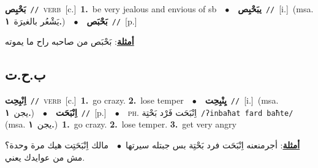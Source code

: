 \documentclass[10pt,a4paper,twoside]{article} %
\begin{document}
\begin{multicols}{2}
{{{{{\setlength\topsep{0pt}\textbf{\foreignlanguage{arabic}{بَحْبِص}}\ {\color{gray}\texttt{//}\color{black}}\ \textsc{verb}\ [c.]\ \textbf{1.}~be very jealous and envious of sb\ \ $\bullet$\ \ \setlength\topsep{0pt}\textbf{\foreignlanguage{arabic}{يبَحْبِص}}\ {\color{gray}\texttt{//}\color{black}}\ [i.]\ \color{gray}(msa. \foreignlanguage{arabic}{يَشْعُر بالغيرَة}~\foreignlanguage{arabic}{\textbf{١.}})\color{black}\ \ $\bullet$\ \ \setlength\topsep{0pt}\textbf{\foreignlanguage{arabic}{بَحْبَص}}\ {\color{gray}\texttt{//}\color{black}}\ [p.]\  \begin{flushright}\color{gray}\foreignlanguage{arabic}{\textbf{\underline{\foreignlanguage{arabic}{أمثلة}}}: بَحْبَص من صاحبه راح ما يموته}\end{flushright}\color{black}} \vspace{2mm}

\vspace{-3mm}
\subsection*{\color{blue}\foreignlanguage{arabic}{ب.ح.ت}\color{blue}{}} 

{\setlength\topsep{0pt}\textbf{\foreignlanguage{arabic}{اِنْبِحِت}}\ {\color{gray}\texttt{//}\color{black}}\ \textsc{verb}\ [c.]\ \textbf{1.}~go crazy.  \textbf{2.}~lose temper\ \ $\bullet$\ \ \setlength\topsep{0pt}\textbf{\foreignlanguage{arabic}{يِنْبِحِت}}\ {\color{gray}\texttt{//}\color{black}}\ [i.]\ \color{gray}(msa. \foreignlanguage{arabic}{يجن}~\foreignlanguage{arabic}{\textbf{١.}})\color{black}\ \ $\bullet$\ \ \setlength\topsep{0pt}\textbf{\foreignlanguage{arabic}{اِنْبَحَت}}\ {\color{gray}\texttt{//}\color{black}}\ [p.]\ \ $\bullet$\ \ \textsc{ph.} \color{gray} \foreignlanguage{arabic}{اِنْبَحَت فَرْد بَحْتِة}\color{black}\ {\color{gray}\texttt{/{\sffamily ʔinbaħat fard baħte}/}\color{black}}\ \color{gray} (msa. \foreignlanguage{arabic}{يجن}~\foreignlanguage{arabic}{\textbf{١.}})\color{black}\ \textbf{1.}~go crazy.  \textbf{2.}~lose temper.  \textbf{3.}~get very angry\  \begin{flushright}\color{gray}\foreignlanguage{arabic}{\textbf{\underline{\foreignlanguage{arabic}{أمثلة}}}: أجرمنعنه اِنْبَحَت فرد بَحْتِة بس جبتله سيرتها\ $\bullet$\ \  مالك اِنْبَحَتِت هيك مرة وحدة؟ مش من عوايدك يعني.}\end{flushright}\color{black}} \vspace{2mm}

}}}}
\end{multicols}
\end{document}
